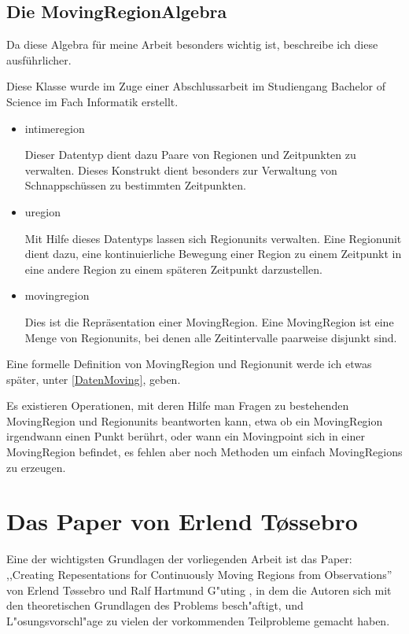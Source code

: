 \subsection{Die MovingRegionAlgebra}
Da diese Algebra für meine Arbeit besonders wichtig ist, beschreibe ich diese ausführlicher.

Diese Klasse wurde im Zuge einer Abschlussarbeit \cite{Mue} im Studiengang Bachelor of Science im Fach Informatik  erstellt.

\begin{itemize}
\item intimeregion

Dieser Datentyp dient dazu Paare von Regionen und Zeitpunkten zu verwalten. Dieses Konstrukt dient besonders zur Verwaltung von Schnappschüssen zu bestimmten Zeitpunkten.
\item uregion

Mit Hilfe dieses Datentyps lassen sich Regionunits verwalten. Eine Regionunit dient dazu, eine kontinuierliche Bewegung einer Region zu einem Zeitpunkt in eine andere Region zu einem späteren Zeitpunkt darzustellen. 
\item movingregion

Dies ist die Repräsentation einer MovingRegion. Eine MovingRegion ist eine Menge von Regionunits, bei denen alle Zeitintervalle paarweise disjunkt sind. 
\end{itemize}

Eine formelle Definition von MovingRegion und Regionunit werde ich etwas später, unter \ref{DatenMoving}, geben.

Es existieren Operationen, mit deren Hilfe man Fragen zu bestehenden MovingRegion und Regionunits beantworten kann, etwa ob ein MovingRegion irgendwann einen Punkt berührt, oder wann ein Movingpoint sich in einer MovingRegion befindet, es fehlen aber noch Methoden um einfach MovingRegions zu erzeugen. 
 
\section{Das Paper von Erlend T\o{}ssebro }\label{Tossebro}

Eine der wichtigsten Grundlagen der vorliegenden Arbeit ist das Paper: ,,Creating Repesentations for Continuously Moving Regions from Observations'' \cite{TG} von Erlend T\o{}ssebro und Ralf Hartmund G"uting \cite{TG}, in dem die Autoren sich mit den theoretischen Grundlagen des Problems besch"aftigt, und L"osungsvorschl"age zu vielen der vorkommenden Teilprobleme gemacht haben.

